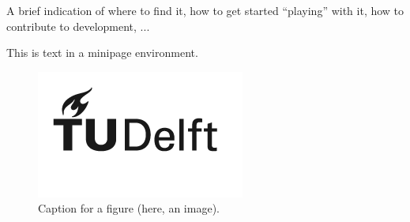     A brief indication of where to find it, how to get started ``playing'' with it, how to contribute to development, ...
\begin{center}
    \begin{minipage}[tc]{30mm}
        This is text in a minipage environment.
    \end{minipage}
\end{center}

\begin{center}
    \begin{figure}[]
                \includegraphics[width=.5\linewidth]{tudelft_logo_black_2022.png}
        \caption[]{Caption for a figure (here, an image).}
    \end{figure}
\end{center}

